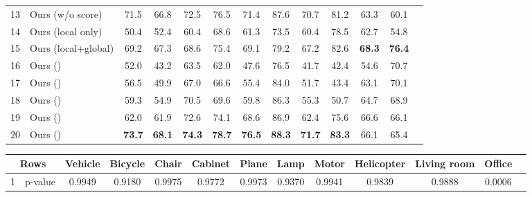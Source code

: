 \documentclass[acmtog]{acmart}
\begin{document}
\begin{table*}[ht]
\begin{tabular*}{\textwidth}{lp{}<{\centering}|ccccccccccc}
    \hline \hline
    13&Ours (w/o score) & 71.5 & 66.8 & 72.5 & 76.5 & 71.4 & 87.6 & 70.7 & 81.2 & 63.3 & 60.1\\
    14&Ours (local only) & 50.4	&52.4	&60.4	&68.6	&61.3	&73.5	&60.4	&78.5	&62.7	&54.8\\
    15&Ours (local+global) & 69.2	&67.3	&68.6	&75.4	&69.1	&79.2	&67.2	&82.6	&\textbf{68.3}	&\textbf{76.4}\\
    16&Ours () & 52.0 & 43.2 & 63.5 & 62.0 & 47.6 & 76.5 & 41.7 & 42.4 & 54.6 & 70.7\\
    17&Ours () & 56.5 & 49.9 & 67.0 & 66.6 & 55.4 & 84.0 & 51.7 & 43.4 & 63.1 & 70.1\\
    18&Ours () & 59.3 & 54.9 & 70.5 & 69.6 & 59.8 & 86.3 & 55.3 & 50.7 & 64.7 & 68.9\\
    19&Ours () & 62.0 & 61.9 & 72.6 & 74.1 & 68.6 & 86.9 & 62.4 & 75.6 & 66.6 & 66.1\\	
    20&Ours () & \textbf{73.7} & \textbf{68.1} & \textbf{74.3} & \textbf{78.7} & \textbf{76.5} & \textbf{88.3} & \textbf{71.7} & \textbf{83.3} & 66.1 & 65.4\\
    \hline
  \end{tabular*}
\label{tab:LabellingAssessment}
\end{table*}

\begin{table*}[ht]
  \centering
    \begin{tabular*}{\textwidth}{lp{}<{\centering}|ccccccccccc}
    \hline
    \multicolumn{2}{c|}{Rows} & Vehicle & Bicycle & Chair & Cabinet & Plane & Lamp  & Motor & Helicopter & Living room & Office \\
    \hline \hline
    1& p-value & 0.9949  & 0.9180 & 0.9975 & 0.9772 & 0.9973 & 0.9370 &  0.9941 &  0.9839  &  0.9888  & 0.0006\\
\hline
  \end{tabular*}
\label{tab:xxx}
\end{table*}
\fi

 
\end{document}
